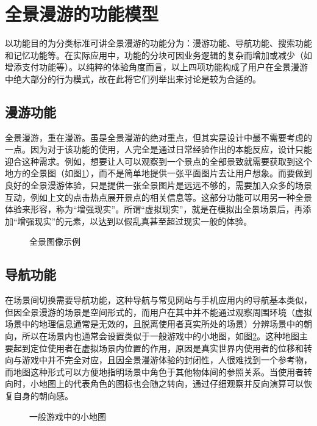 \section{全景漫游的功能模型}
以功能目的为分类标准可讲全景漫游的功能分为：漫游功能、导航功能、搜索功能和记忆功能等。在实际应用中，功能的分块可因业务逻辑的复杂而增加或减少（如增添支付功能等）。以纯粹的体验角度而言，以上四项功能构成了用户在全景漫游中绝大部分的行为模式，故在此将它们列举出来讨论是较为合适的。

\subsection{漫游功能}
全景漫游，重在漫游。虽是全景漫游的绝对重点，但其实是设计中最不需要考虑的一点。因为对于该功能的使用，人完全是通过日常经验作出的本能反应，设计只能迎合这种需求。例如，想要让人可以观察到一个景点的全部景致就需要获取到这个地方的全景图（如图\ref{fig:hongcun}），而不是简单地提供一张平面图片去让用户想象。而要做到良好的全景漫游体验，只是提供一张全景图片是远远不够的，需要加入众多的场景互动，例如上文的点击热点展开景点的相关信息等。这部分功能可以用另一种全景体验来形容，称为“增强现实”。所谓“虚拟现实”，就是在模拟出全景场景后，再添加“增强现实”的元素，以达到以假乱真甚至超过现实一般的体验。

\begin{figure}[htp]
\centering
{}
\caption{全景图像示例}
\label{fig:hongcun}
\end{figure}

\subsection{导航功能}
在场景间切换需要导航功能，这种导航与常见网站与手机应用内的导航基本类似，但因全景漫游的场景是空间形式的，而用户在其中并不能通过观察周围环境（虚拟场景中的地理信息通常是无效的，且脱离使用者真实所处的场景）分辨场景中的朝向，所以在场景内也通常会设置类似于一般游戏中的小地图，如图\ref{fig:minimap}。这种地图主要起到定位使用者在虚拟场景内位置的作用，原因是真实世界内使用者的位移和转向与游戏中并不完全对应，且因全景漫游体验的封闭性，人很难找到一个参考物，而地图这种形式可以方便地指明场景中角色于其他物体间的参照关系。当使用者转向时，小地图上的代表角色的图标也会随之转向，通过仔细观察并反向演算可以恢复自身的朝向感。

\begin{figure}[htp]
\centering
{}
\caption{一般游戏中的小地图}
\label{fig:minimap}
\end{figure}

